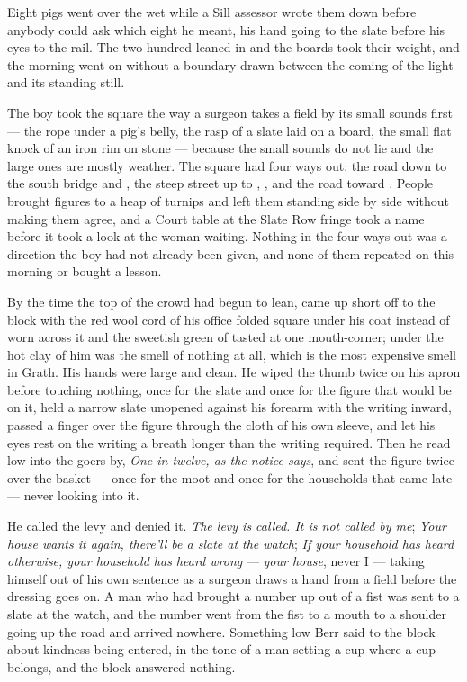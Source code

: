 \scenebreak

Eight pigs went over the wet  while a Sill assessor wrote them down before anybody could ask which eight he meant, his hand going to the slate before his eyes to the rail. The two hundred leaned in and the boards took their weight, and the morning went on without a boundary drawn between the coming of the light and its standing still.

The boy took the square the way a surgeon takes a field by its small sounds first --- the rope under a pig's belly, the rasp of a slate laid on a board, the small flat knock of an iron rim on stone --- because the small sounds do not lie and the large ones are mostly weather. The square had four ways out: the road down to the south bridge and , the steep street up to , , and the road toward . People brought figures to a heap of turnips and left them standing side by side without making them agree, and a Court table at the Slate Row fringe took a name before it took a look at the woman waiting. Nothing in the four ways out was a direction the boy had not already been given, and none of them repeated on this morning or bought a lesson.

By the time the top of the crowd had begun to lean,  came up short off  to the block with the red wool cord of his office folded square under his coat instead of worn across it and the sweetish green of tasted  at one mouth-corner; under the hot clay of him was the smell of nothing at all, which is the most expensive smell in Grath. His hands were large and clean. He wiped the thumb twice on his apron before touching nothing, once for the slate and once for the figure that would be on it, held a narrow slate unopened against his forearm with the writing inward, passed a finger over the figure through the cloth of his own sleeve, and let his eyes rest on the writing a breath longer than the writing required. Then he read low into the goers-by, \emph{One in twelve, as the notice says}, and sent the figure twice over the basket --- once for the moot and once for the households that came late --- never looking into it.

He called the levy and denied it. \emph{The levy is called. It is not called by me}; \emph{Your house wants it again, there'll be a slate at the watch}; \emph{If your household has heard otherwise, your household has heard wrong} --- \emph{your house}, never I --- taking himself out of his own sentence as a surgeon draws a hand from a field before the dressing goes on. A man who had brought a number up out of a fist was sent to a slate at the watch, and the number went from the fist to a mouth to a shoulder going up the road and arrived nowhere. Something low Berr said to the block about kindness being entered, in the tone of a man setting a cup where a cup belongs, and the block answered nothing.

